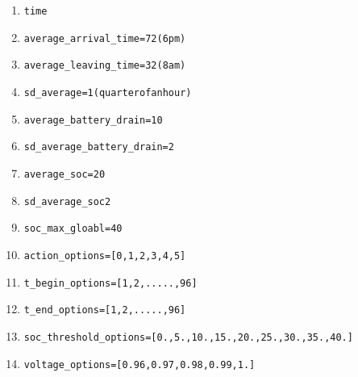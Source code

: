 \documentclass[a4paper]{article}
\begin{document}
\begin{enumerate}
 \item \begin{alltt}time\end{alltt}
 \item \begin{alltt}average_arrival_time = 72 (6pm)\end{alltt}
 \item \begin{alltt}average_leaving_time = 32 (8am) \end{alltt}
 \item \begin{alltt}sd_average = 1 (quarter of an hour)\end{alltt}
 \item \begin{alltt}average_battery_drain = 10 \end{alltt}
 \item \begin{alltt}sd_average_battery_drain = 2\end{alltt}
 \item \begin{alltt}average_soc = 20 \end{alltt}
 \item \begin{alltt}sd_average_soc 2\end{alltt}
 \item \begin{alltt}soc_max_gloabl = 40\end{alltt}
 \item \begin{alltt}action_options = [0,1,2,3,4,5]\end{alltt}
 \item \begin{alltt}t_begin_options = [1,2,.....,96]\end{alltt}
 \item \begin{alltt}t_end_options = [1,2,.....,96]\end{alltt}
 \item \begin{alltt}soc_threshold_options = [  0.,   5.,  10.,  15.,  20.,  25.,  30.,  35.,  40.]\end{alltt}
 \item \begin{alltt}voltage_options = [ 0.96,  0.97,  0.98,  0.99,  1.  ]\end{alltt}
\end{enumerate}
\end{document}
